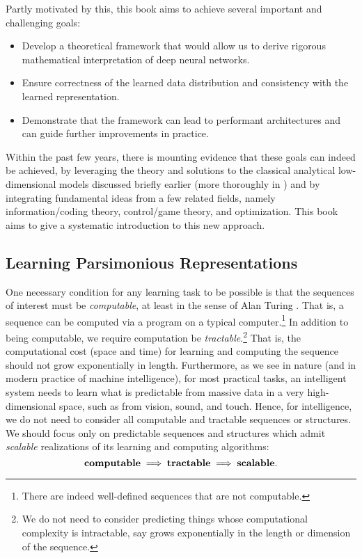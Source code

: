 \documentclass[../../book-main.tex]{subfiles}
\begin{document}
Partly motivated by this, this book aims to achieve several important and challenging goals: 
\begin{itemize}
    \item Develop a theoretical framework that would allow us to derive rigorous mathematical interpretation of deep neural networks.
    \item Ensure correctness of the learned data distribution and consistency with the learned representation.
    \item Demonstrate that the framework can lead to performant architectures and can guide further improvements in practice.
\end{itemize}
Within the past few years, there is mounting evidence that these goals can indeed be achieved, by leveraging the theory and solutions to the classical analytical low-dimensional models discussed briefly earlier (more thoroughly in ) and by integrating fundamental ideas from a few related fields, namely information/coding theory, control/game theory, and optimization. This book aims to give a systematic introduction to this new approach.

\subsection{Learning Parsimonious Representations}
\label{sec:computational-approach-compression}
One necessary condition for any  learning task to be possible is that the sequences of interest must be {\em computable}, at least in the sense of Alan Turing \cite{Turing-1936}. That is, a sequence can be computed via a program on a typical computer.\footnote{There are indeed well-defined sequences that are not computable.} In addition to being computable, we require computation be {\em tractable}.\footnote{We do not need to consider predicting things whose computational complexity is intractable, say grows exponentially in the length or dimension of the sequence.} That is, the computational cost (space and time) for learning and computing the sequence should not grow exponentially in length. Furthermore, as we see in nature (and in modern practice of machine intelligence), for most practical tasks, an intelligent system needs to learn what is predictable from massive data in a very high-dimensional space, such as from vision, sound, and touch. Hence, for intelligence, we do not need to consider all computable and tractable sequences or structures. We should focus only on predictable sequences and structures which admit {\em scalable} realizations of its learning and computing algorithms:
\begin{equation}
\mbox{\textbf{computable}} \;
   \Longrightarrow \; \mbox{\textbf{tractable}} \; \Longrightarrow \; 
   \mbox{\textbf{scalable}}.
\end{equation}
\end{document}

